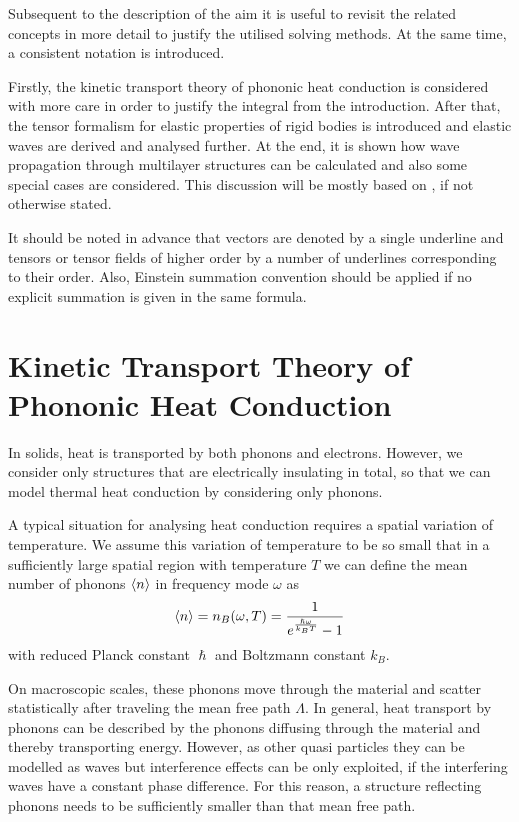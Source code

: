 Subsequent to the description of the aim it is useful to revisit the related
concepts in more detail to justify the utilised solving methods.
At the same time, a consistent notation is introduced.

Firstly, the kinetic transport theory of phononic heat conduction is considered
with more care in order to justify the integral from the introduction.
After that, the tensor formalism for elastic properties
of rigid bodies is introduced and elastic waves are derived and
analysed further. At the end, it is shown how wave propagation through
multilayer structures can be calculated and also some special cases are
considered. This discussion will be mostly based on \cite{GrossMarx2014},
if not otherwise stated.

It should be noted in advance that vectors are
denoted by a single underline and tensors or
tensor fields of higher order by a number of underlines corresponding to their
order. Also, Einstein summation convention should be applied if no explicit
summation is given in the same formula.

\section{Kinetic Transport Theory of Phononic Heat Conduction}
In solids, heat is transported by both phonons and electrons.  However, we
consider only structures that are electrically insulating in total, so that
we can model thermal heat conduction by considering only phonons.

A typical situation for analysing heat conduction requires a spatial variation
of temperature. We assume this variation of temperature to be so small that in
a sufficiently large spatial region with temperature $T$ we can define the mean
number of phonons $\expval{n}$ in frequency mode $\omega$ as
\begin{equation}
    \expval{n} = n_B(\omega,T) = \frac{1}{e^{\frac{\hslash \omega}{k_BT}} - 1 }
\end{equation}
with reduced Planck constant $\hslash$ and Boltzmann constant $k_B$.

On macroscopic scales, these phonons move through the material and scatter
statistically after traveling the mean free path $\Lambda$. In general,
heat transport by phonons can be described by the phonons diffusing through
the material and thereby transporting energy. However, as other quasi
particles they can be modelled as waves but interference effects can be only
exploited, if the interfering waves have a constant phase difference. For this
reason, a structure reflecting phonons needs to be sufficiently smaller than
that mean free path.

